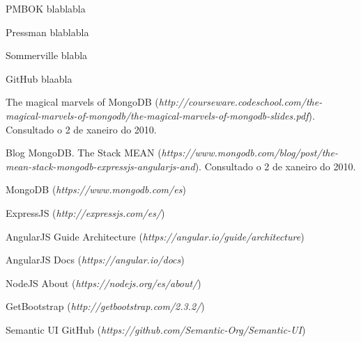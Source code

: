 

\begin{thebibliography}{99}
%
%
%

 PMBOK blablabla

 Pressman blablabla

 Sommerville blabla

 GitHub  blaabla

 The magical marvels of MongoDB ({\it http://courseware.codeschool.com/the-magical-marvels-of-mongodb/the-magical-marvels-of-mongodb-slides.pdf}). Consultado o 2 de xaneiro do 2010.

 Blog MongoDB. The Stack MEAN ({\it https://www.mongodb.com/blog/post/the-mean-stack-mongodb-expressjs-angularjs-and}). Consultado o 2 de xaneiro do 2010.

 MongoDB ({\it https://www.mongodb.com/es})

 ExpressJS ({\it http://expressjs.com/es/})

 AngularJS Guide Architecture ({\it https://angular.io/guide/architecture})

 AngularJS Docs ({\it https://angular.io/docs})

 NodeJS About ({\it https://nodejs.org/es/about/})

 GetBootstrap ({\it http://getbootstrap.com/2.3.2/})

 Semantic UI GitHub ({\it https://github.com/Semantic-Org/Semantic-UI}) 



\end{thebibliography}


